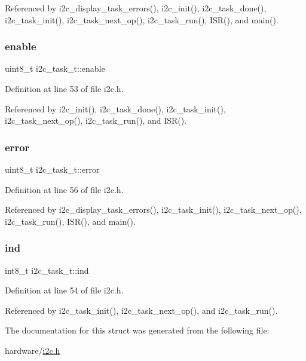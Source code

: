 Referenced by i2c\+\_\+display\+\_\+task\+\_\+errors(), i2c\+\_\+init(), i2c\+\_\+task\+\_\+done(), i2c\+\_\+task\+\_\+init(), i2c\+\_\+task\+\_\+next\+\_\+op(), i2c\+\_\+task\+\_\+run(), I\+S\+R(), and main().

\mbox{\label{structi2c__task__t_a190ee59e30dfd96f7b88441a5651ce07}} 
\subsubsection{\texorpdfstring{enable}{enable}}
{\footnotesize\ttfamily uint8\+\_\+t i2c\+\_\+task\+\_\+t\+::enable}



Definition at line 53 of file i2c.\+h.



Referenced by i2c\+\_\+init(), i2c\+\_\+task\+\_\+done(), i2c\+\_\+task\+\_\+init(), i2c\+\_\+task\+\_\+next\+\_\+op(), i2c\+\_\+task\+\_\+run(), and I\+S\+R().

\mbox{\label{structi2c__task__t_af75c17e49bf863e9aee2e574594028eb}} 
\subsubsection{\texorpdfstring{error}{error}}
{\footnotesize\ttfamily uint8\+\_\+t i2c\+\_\+task\+\_\+t\+::error}



Definition at line 56 of file i2c.\+h.



Referenced by i2c\+\_\+display\+\_\+task\+\_\+errors(), i2c\+\_\+task\+\_\+init(), i2c\+\_\+task\+\_\+next\+\_\+op(), i2c\+\_\+task\+\_\+run(), I\+S\+R(), and main().

\mbox{\label{structi2c__task__t_a401fd313653ee49d63a30e766435b4f6}} 
\subsubsection{\texorpdfstring{ind}{ind}}
{\footnotesize\ttfamily int8\+\_\+t i2c\+\_\+task\+\_\+t\+::ind}



Definition at line 54 of file i2c.\+h.



Referenced by i2c\+\_\+task\+\_\+init(), i2c\+\_\+task\+\_\+next\+\_\+op(), and i2c\+\_\+task\+\_\+run().



The documentation for this struct was generated from the following file\+:\begin{DoxyCompactItemize}
\item 
hardware/\hyperlink{i2c_8h}{i2c.\+h}\end{DoxyCompactItemize}
